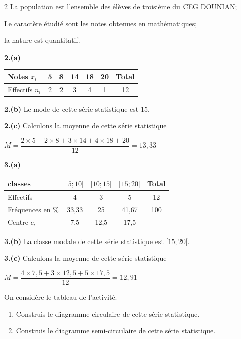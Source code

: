 \begin{multicols*}{2}
 	 La population est l'ensemble des élèves de troisième du CEG DOUNIAN;
 	
 	 Le caractère étudié sont les notes obtenues en mathématiques;
 	
 	 la nature est quantitatif.
 	
 	\textbf{2.(a)} 
 	
 	\begin{tabular}{|p{1.7cm}|c|c|c|c|c|c|}
 		\hline
 		Notes $x_{i}$ & 5 & 8 & 14 & 18 & 20 & Total \\ \hline
 		Effectifs $n_{i}$ & 2 & 2 & 3 &4&1& 12\\ 
 		\hline
 	\end{tabular}
 	
 	\vspace*{0.4cm}
 	\textbf{2.(b)} Le mode de cette série statistique est 15.
 	
 	\textbf{2.(c)} Calculons la moyenne de cette série statistique
 	
 	$M=\dfrac{2\times5+2\times8+3\times14+4\times18+20}{12}=13,33$
 	
 	\textbf{3.(a)}
 	
 	\begin{tabular}{|p{1.7cm}|c|c|c|c|}
 		\hline
 		classes & $[5; 10[$ & $[10;15[$ & $[15; 20[$ & Total \\ \hline
 		Effectifs &4 & 3& 5&12 \\ 
 		\hline
 		Fréquences en \% &33,33&25&41,67 & 100\\ 
 		\hline
 		Centre $c_{i}$&7,5&12,5&17,5&\\	
 		\hline
 	\end{tabular}
 	
 	\textbf{3.(b)} La classe modale de cette série statistique est $[15; 20[$.
 	
 	\textbf{3.(c)} Calculons la moyenne de cette série statistique
 	
 	$M=\dfrac{4\times7,5+3\times12,5+5\times17,5}{12}=12,91$
 	
 	On considère le tableau de l'activité.
 	\begin{enumerate}
 		\item Construis le diagramme circulaire de cette série statistique.
 		\item Construis le diagramme semi-circulaire de cette série statistique.
 	\end{enumerate}
 	\dure 
 	

\end{multicols*}
